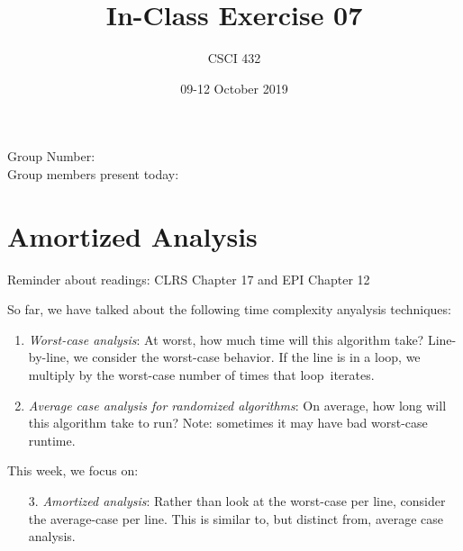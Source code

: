 \documentclass{article}
\title{In-Class Exercise 07}
\author{CSCI 432}
\date{09-12 October 2019}
\begin{document}
\maketitle

\noindent
Group Number:\\
Group members present today:

\section*{Amortized Analysis}

Reminder about readings: CLRS Chapter 17 and EPI Chapter 12

So far, we have talked about the following time complexity anyalysis techniques:
\begin{enumerate}
\item \emph{Worst-case analysis}: At worst, how much time will this algorithm take?
Line-by-line, we consider the worst-case behavior.  If the line is in a
loop, we multiply by the worst-case number of times that loop~iterates.
\item \emph{Average case analysis for randomized algorithms}: On average, how long
will this algorithm take to run?  Note: sometimes it may have bad
worst-case runtime.
\end{enumerate}
This week, we focus on:
\begin{enumerate}
\item[3.] \emph{Amortized analysis}: Rather than look at the worst-case per
line, consider the average-case per line.  This is similar to, but
distinct from, average case analysis.
\end{enumerate}
\end{document}
